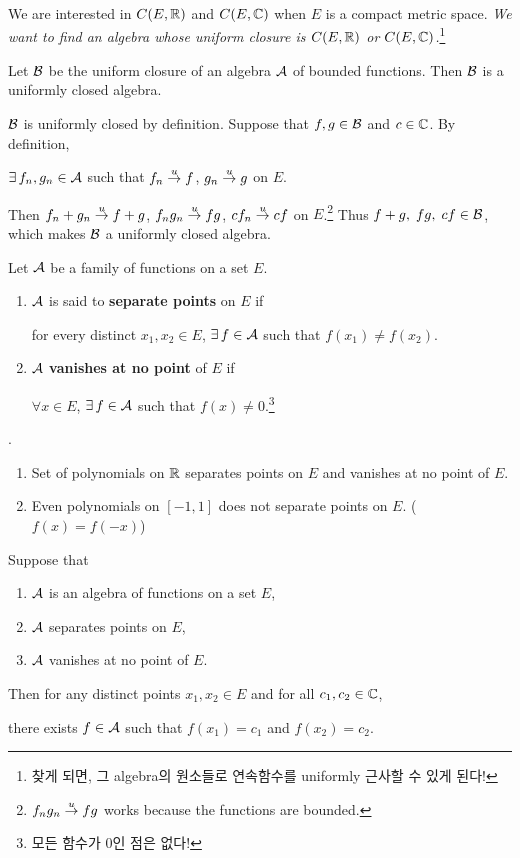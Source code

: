 \medskip

\question We are interested in \(C(E, \mathbb{R})\) and \(C(E, \mathbb{C})\) when \(E\) is a compact metric space. \textit{We want to find an algebra whose uniform closure is \(C(E, \mathbb{R})\) or \(C(E, \mathbb{C})\).}\footnote{찾게 되면, 그 algebra의 원소들로 연속함수를 uniformly 근사할 수 있게 된다!}

 Let \(\mathcal{B}\) be the uniform closure of an algebra \(\mathcal{A}\) of bounded functions. Then \(\mathcal{B}\) is a uniformly closed algebra.

\pf \(\mathcal{B}\) is uniformly closed by definition. Suppose that \(f, g \in \mathcal{B}\) and \(c \in \mathbb{C}\). By definition,
\begin{center}
    \(\exists f_n, g_n \in \mc{A}\) such that \(f_n \overset{u}{\rightarrow} f\), \(g_n \overset{u}{\rightarrow} g\) on \(E\).
\end{center}
Then \(f_n + g_n \overset{u}{\rightarrow} f+g\), \(f_n g_n \overset{u}{\rightarrow} fg\), \(cf_n \overset{u}{\rightarrow} cf\) on \(E\).\footnote{\(f_n g_n \overset{u}{\rightarrow} fg\) works because the functions are bounded.} Thus \(f+g,\; fg,\; cf \in \mathcal{B}\), which makes \(\mathcal{B}\) a uniformly closed algebra.

 Let \(\mathcal{A}\) be a family of functions on a set \(E\).
\begin{enumerate}
    \item \(\mathcal{A}\) is said to \textbf{separate points} on \(E\) if
          \begin{center}
              for every distinct \(x_1, x_2 \in E\), \(\exists f\in \mc{A}\) such that \(f(x_1) \neq f(x_2)\).
          \end{center}
    \item \(\mathcal{A}\) \textbf{vanishes at no point} of \(E\) if
          \begin{center}
              \(\forall x \in E\), \(\exists f \in \mc{A}\) such that \(f(x) \neq 0\).\footnote{모든 함수가 0인 점은 없다!}
          \end{center}
\end{enumerate}

\ex.
\begin{enumerate}
    \item Set of polynomials on \(\mathbb{R}\) separates points on \(E\) and vanishes at no point of \(E\).
    \item Even polynomials on \([-1, 1]\) does not separate points on \(E\). (\(f(x) = f(-x)\))
\end{enumerate}

\medskip

 Suppose that
\begin{enumerate}
    \item \(\mathcal{A}\) is an algebra of functions on a set \(E\),
    \item \(\mathcal{A}\) separates points on \(E\),
    \item \(\mathcal{A}\) vanishes at no point of \(E\).
\end{enumerate}
Then for any distinct points \(x_1, x_2 \in E\) and for all \(c_1, c_2 \in \mathbb{C}\),
\begin{center}
    there exists \(f \in \mathcal{A}\) such that \(f(x_1) = c_1\) and \(f(x_2) = c_2\).
\end{center}

